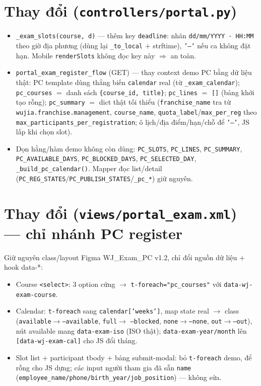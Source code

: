\section{Thay đổi (\texttt{controllers/portal.py})}

\begin{itemize}
  \item \texttt{\_exam\_slots(course, d)} --- thêm key \texttt{deadline}: nhãn
    \texttt{dd/mm/YYYY · HH:MM} theo giờ địa phương (dùng lại \texttt{\_to\_local} $+$
    strftime), \texttt{'—'} nếu ca không đặt hạn. Mobile \texttt{renderSlots} không đọc key
    này $\Rightarrow$ an toàn.
  \item \texttt{portal\_exam\_register\_flow} (GET) --- thay context demo PC bằng dữ liệu
    thật: PC template dùng thẳng biến \texttt{calendar} real (từ \texttt{\_exam\_calendar});
    \texttt{pc\_courses} $=$ danh sách \texttt{\{course\_id, title\}}; \texttt{pc\_lines}
    $=$ \texttt{[]} (bảng khởi tạo rỗng); \texttt{pc\_summary} $=$ dict thật tối thiểu
    (\texttt{franchise\_name} tra từ \texttt{wujia.franchise.management},
    \texttt{course\_name}, \texttt{quota\_label}/\texttt{max\_per\_reg} theo
    \texttt{max\_participants\_per\_registration}; ô lịch/địa điểm/hạn/chỗ để \texttt{'—'},
    JS lấp khi chọn slot).
  \item Dọn hằng/hàm demo không còn dùng: \texttt{PC\_SLOTS}, \texttt{PC\_LINES},
    \texttt{PC\_SUMMARY}, \texttt{PC\_AVAILABLE\_DAYS}, \texttt{PC\_BLOCKED\_DAYS},
    \texttt{PC\_SELECTED\_DAY}, \texttt{\_build\_pc\_calendar()}. Mapper đọc list/detail
    (\texttt{PC\_REG\_STATES}/\texttt{PC\_PUBLISH\_STATES}/\texttt{\_pc\_*}) giữ nguyên.
\end{itemize}

\section{Thay đổi (\texttt{views/portal\_exam.xml}) --- chỉ nhánh PC register}

Giữ nguyên class/layout Figma WJ\_Exam\_PC v1.2, chỉ đổi nguồn dữ liệu $+$ hook data-*:

\begin{itemize}
  \item Course \texttt{<select>}: 3 option cứng $\rightarrow$ \texttt{t-foreach="pc\_courses"}
    với \texttt{data-wj-exam-course}.
  \item Calendar: \texttt{t-foreach} sang \texttt{calendar['weeks']}, map state real
    $\rightarrow$ class (\texttt{available}$\to$\texttt{--available}, \texttt{full}$\to$
    \texttt{--blocked}, \texttt{none}$\to$\texttt{--none}, \texttt{out}$\to$\texttt{--out}),
    nút available mang \texttt{data-exam-iso} (ISO thật); \texttt{data-exam-year/month} lên
    \texttt{[data-wj-exam-cal]} cho JS đổi tháng.
  \item Slot list $+$ participant tbody $+$ bảng submit-modal: bỏ \texttt{t-foreach} demo,
    để rỗng cho JS dựng; các input người tham gia đã sẵn \texttt{name}
    (\texttt{employee\_name/phone/birth\_year/job\_position}) --- không sửa.
\end{itemize}

